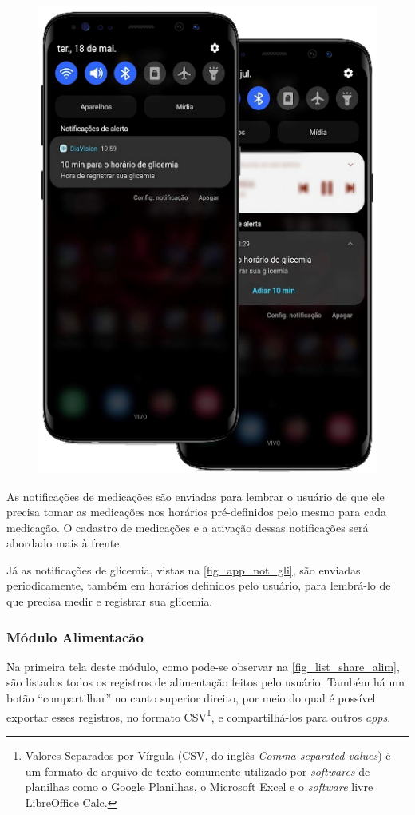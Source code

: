 \begin{figure}[htb]
\begin{minipage}{0.58\textwidth}
        \includegraphics[scale=0.59]{Imagens/desenvolvimento/app/app_not_gli.png}
    \end{minipage}
\end{figure}

As notificações de medicações são enviadas para lembrar o usuário de que ele precisa tomar as medicações
nos horários pré-definidos pelo mesmo para cada medicação. O cadastro de medicações e a ativação dessas
notificações será abordado mais à frente.

Já as notificações de glicemia, vistas na \autoref{fig_app_not_gli}, são enviadas periodicamente, também
em horários definidos pelo usuário, para lembrá-lo de que precisa medir e registrar sua glicemia.

\newpage

\subsubsection{Módulo Alimentacão}

Na primeira tela deste módulo, como pode-se observar na \autoref{fig_list_share_alim}, são listados todos
os registros de alimentação feitos pelo usuário. Também há um botão “compartilhar” no canto superior direito,
por meio do qual é possível exportar esses registros, no formato CSV\footnote{Valores Separados por Vírgula
    (CSV, do inglês \emph{Comma-separated values}) é um formato de arquivo de texto comumente utilizado por
    \emph{softwares} de planilhas como o Google Planilhas, o Microsoft Excel e o \emph{software} livre
    LibreOffice Calc.}, e compartilhá-los para outros \emph{apps}.

